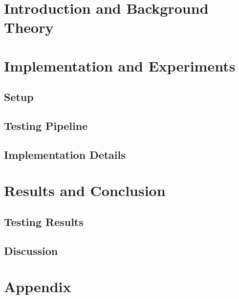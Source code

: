 
\addtolength{\evensidemargin}{-12mm}

%
%
\part{Introduction and Background Theory}
\label{part:introAndBackgroundTheory}




%
\part{Implementation and Experiments}
\label{part:experimentsAndResults}
\chapter{Setup}
\chapter{Testing Pipeline}
\chapter{Implementation Details}

\part[Results and Conclusion]{Results and Conclusion}
\label{part:resultsAndConclusion}
\chapter{Testing Results}
\chapter{Discussion}

%
%

\part*{Appendix}

\appendix %

%

